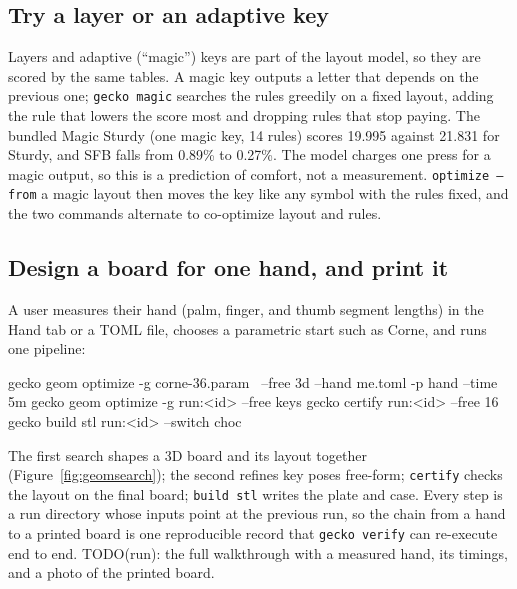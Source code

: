 \documentclass{gecko-paper}
\begin{document}
\begin{paperbody}

\subsection{Try a layer or an adaptive key}
Layers and adaptive (``magic'') keys are part of the layout model, so they are scored by the same tables. A magic key outputs a letter that depends on the previous one; \texttt{gecko magic} searches the rules greedily on a fixed layout, adding the rule that lowers the score most and dropping rules that stop paying. The bundled Magic Sturdy (one magic key, 14 rules) scores 19.995 against 21.831 for Sturdy, and SFB falls from 0.89\% to 0.27\%. The model charges one press for a magic output, so this is a prediction of comfort, not a measurement. \texttt{optimize --from} a magic layout then moves the key like any symbol with the rules fixed, and the two commands alternate to co-optimize layout and rules.

\subsection{Design a board for one hand, and print it}
A user measures their hand (palm, finger, and thumb segment lengths) in the Hand tab or a TOML file, chooses a parametric start such as Corne, and runs one pipeline:
\begin{papercode}
gecko geom optimize -g corne-36.param \
  --free 3d --hand me.toml -p hand --time 5m
gecko geom optimize -g run:<id> --free keys
gecko certify run:<id> --free 16
gecko build stl run:<id> --switch choc
\end{papercode}
The first search shapes a 3D board and its layout together (Figure~\ref{fig:geomsearch}); the second refines key poses free-form; \texttt{certify} checks the layout on the final board; \texttt{build stl} writes the plate and case. Every step is a run directory whose inputs point at the previous run, so the chain from a hand to a printed board is one reproducible record that \texttt{gecko verify} can re-execute end to end. TODO(run): the full walkthrough with a measured hand, its timings, and a photo of the printed board.


\end{paperbody}
\end{document}
